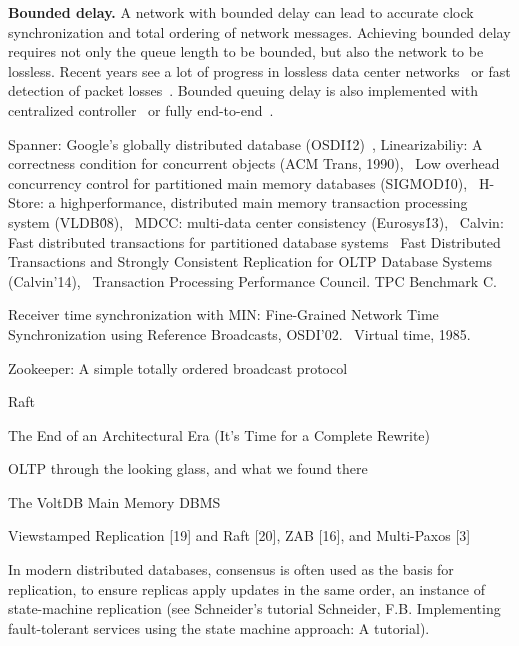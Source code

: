 \textbf{Bounded delay.}
A network with bounded delay can lead to accurate clock synchronization and total ordering of network messages.
Achieving bounded delay requires not only the queue length to be bounded, but also the network to be lossless.
Recent years see a lot of progress in lossless data center networks~\cite{calder2013don,cheng2014catch,handley2017re} or fast detection of packet losses~\cite{li2016lossradar}.
Bounded queuing delay is also implemented with centralized controller~\cite{perry2015fastpass} or fully end-to-end~\cite{cho2017credit}.




\iffalse


Spanner: Google’s globally distributed database (OSDI\'12)~\cite{corbett2013spanner},
Linearizabiliy: A correctness condition for concurrent objects (ACM Trans, 1990),~\cite{herlihy1990linearizability}
Low overhead concurrency control for partitioned main memory databases (SIGMOD\'10),~\cite{jones2010low}
H-Store: a highperformance,
distributed main memory transaction processing
system (VLDB\'08),~\cite{kallman2008h}
MDCC: multi-data center consistency (Eurosys\'13),~\cite{kraska2013mdcc}
Calvin: Fast distributed transactions for
partitioned database systems~\cite{thomson2012calvin}
Fast Distributed Transactions and Strongly Consistent Replication
for OLTP Database Systems (Calvin'14),~\cite{thomson2014fast}
Transaction Processing Performance Council. TPC
Benchmark C.~\cite{council2005transaction}

Receiver time synchronization with MIN:
Fine-Grained Network Time Synchronization using Reference
Broadcasts, OSDI'02.~\cite{elson2002fine}
Virtual time, 1985.~\cite{jefferson1985virtual}


Zookeeper: A simple totally ordered broadcast protocol

Raft

The End of an Architectural Era
(It’s Time for a Complete Rewrite)

OLTP through the looking glass, and what we found there

The VoltDB Main Memory DBMS

Viewstamped Replication [19] and Raft [20], ZAB [16], and Multi-Paxos [3]

In modern distributed databases, consensus is often used as the basis for replication, to ensure replicas apply updates in the same order, an instance of state-machine replication (see Schneider’s tutorial Schneider, F.B. Implementing fault-tolerant services using the state machine approach: A tutorial).

